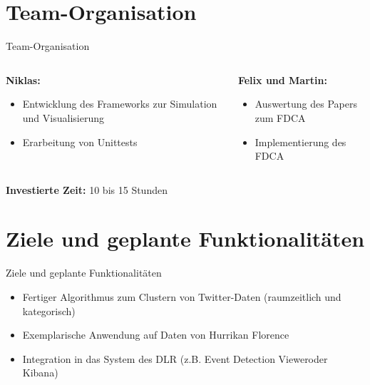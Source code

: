 \documentclass[12pt, xcolor={usenames,dvipsnames,svgnames,x11names,table}]{beamer}
\begin{document}
	
	\section{Team-Organisation}
	\begin{frame}{Team-Organisation}
		\begin{columns}[t, onlytextwidth]
			\begin{column}{.5\textwidth}
				\textbf{Niklas:}
				\begin{itemize}
					\item Entwicklung des Frameworks zur Simulation und Visualisierung
					\item Erarbeitung von Unittests
				\end{itemize}
			\end{column}
			
			\begin{column}{.5\textwidth}
				\textbf{Felix und Martin:}
				\begin{itemize}
					\item Auswertung des Papers zum FDCA
					\item Implementierung des FDCA
				\end{itemize}
			\end{column}
		\end{columns}\bigskip\bigskip
		\textbf{Investierte Zeit:} 10 bis 15 Stunden
	\end{frame}
	
	
	\section{Ziele und geplante Funktionalitäten}
	\begin{frame}{Ziele und geplante Funktionalitäten}{}
		\begin{itemize}
			\item Fertiger Algorithmus zum Clustern von Twitter-Daten (raumzeitlich und kategorisch)
			\item Exemplarische Anwendung auf Daten von Hurrikan Florence
			\item Integration in das System des DLR (z.B. \glqq Event Detection Viewer\grqq oder \glqq Kibana\grqq)
		\end{itemize}
	\end{frame}
	
	
\end{document}
